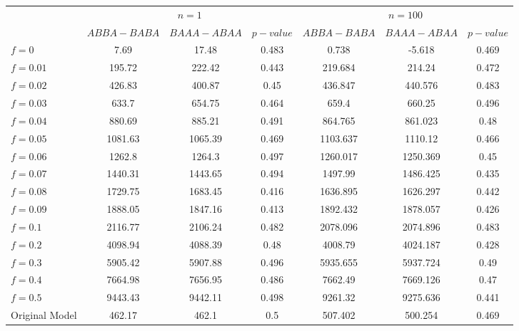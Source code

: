 \begin{tabular}{@{}lcccccc@{}}
\toprule
 & \multicolumn{3}{c}{$n=1$} & \multicolumn{3}{c}{$n=100$} \\
\cmidrule(lr){2-4} \cmidrule(lr){5-7}
 & $ABBA-BABA$ & $BAAA-ABAA$ & $p-value$ & $ABBA-BABA$ & $BAAA-ABAA$ & $p-value$ \\
\midrule
$f = 0$ & 7.69 & 17.48 & 0.483 & 0.738 & -5.618 & 0.469 \\
$f = 0.01$ & 195.72 & 222.42 & 0.443 & 219.684 & 214.24 & 0.472 \\
$f = 0.02$ & 426.83 & 400.87 & 0.45 & 436.847 & 440.576 & 0.483 \\
$f = 0.03$ & 633.7 & 654.75 & 0.464 & 659.4 & 660.25 & 0.496 \\
$f = 0.04$ & 880.69 & 885.21 & 0.491 & 864.765 & 861.023 & 0.48 \\
$f = 0.05$ & 1081.63 & 1065.39 & 0.469 & 1103.637 & 1110.12 & 0.466 \\
$f = 0.06$ & 1262.8 & 1264.3 & 0.497 & 1260.017 & 1250.369 & 0.45 \\
$f = 0.07$ & 1440.31 & 1443.65 & 0.494 & 1497.99 & 1486.425 & 0.435 \\
$f = 0.08$ & 1729.75 & 1683.45 & 0.416 & 1636.895 & 1626.297 & 0.442 \\
$f = 0.09$ & 1888.05 & 1847.16 & 0.413 & 1892.432 & 1878.057 & 0.426 \\
$f = 0.1$ & 2116.77 & 2106.24 & 0.482 & 2078.096 & 2074.896 & 0.483 \\
$f = 0.2$ & 4098.94 & 4088.39 & 0.48 & 4008.79 & 4024.187 & 0.428 \\
$f = 0.3$ & 5905.42 & 5907.88 & 0.496 & 5935.655 & 5937.724 & 0.49 \\
$f = 0.4$ & 7664.98 & 7656.95 & 0.486 & 7662.49 & 7669.126 & 0.47 \\
$f = 0.5$ & 9443.43 & 9442.11 & 0.498 & 9261.32 & 9275.636 & 0.441 \\
Original Model & 462.17 & 462.1 & 0.5 & 507.402 & 500.254 & 0.469 \\
\bottomrule
\end{tabular}
